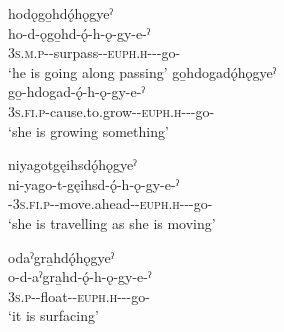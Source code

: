 \ex hodǫgo̱hdǫ́hǫgyeˀ\\
\gll ho-d-ǫgo̱hd-ǫ́-h-ǫ-gy-e-ˀ\\
 \textsc{3s.m.p}-{\semireflexive}-surpass-{\stative}-\textsc{euph.h}-{\joiner}-{\progressive}-go-{\stative}\\
\glt `he is going along passing'
\ex go̱hdogadǫ́hǫgyeˀ\\
\gll go̱-hdogad-ǫ́-h-ǫ-gy-e-ˀ\\
 \textsc{3s.fi.p}-cause.to.grow-{\stative}-\textsc{euph.h}-{\joiner}-{\progressive}-go-{\stative}\\
\glt `she is growing something'


\ex niyagotgęihsdǫ́hǫgyeˀ\\
\gll ni-yago-t-gęihsd-ǫ́-h-ǫ-gy-e-ˀ\\
{\partitive}-\textsc{3s.fi.p}-{\semireflexive}-move.ahead-{\stative}-\textsc{euph.h}-{\joiner}-{\progressive}-go-{\stative}\\
\glt  `she is travelling as she is moving'


\ex odaˀgra̱hdǫ́hǫgyeˀ\\
\gll o-d-aˀgra̱hd-ǫ́-h-ǫ-gy-e-ˀ\\
 \textsc{3s.p}-{\semireflexive}-float-{\stative}-\textsc{euph.h}-{\joiner}-{\progressive}-go-{\stative}\\
\glt `it is surfacing'

\z
\z

